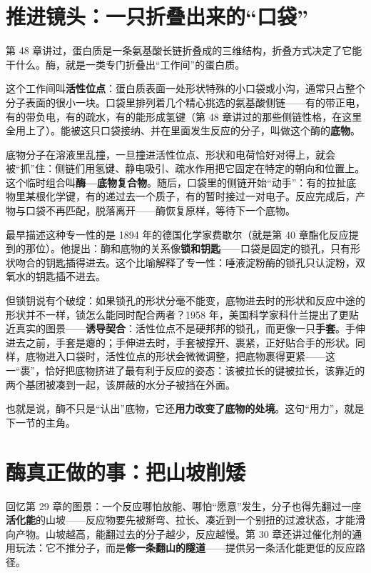 \section{推进镜头：一只折叠出来的“口袋”}

第 48 章讲过，蛋白质是一条氨基酸长链折叠成的三维结构，折叠方式决定了它能干什么。酶，就是一类专门折叠出“工作间”的蛋白质。

这个工作间叫\textbf{活性位点}：蛋白质表面一处形状特殊的小口袋或小沟，通常只占整个分子表面的很小一块。口袋里排列着几个精心挑选的氨基酸侧链——有的带正电，有的带负电，有的疏水，有的能形成氢键（第 48 章讲过的那些侧链性格，在这里全用上了）。能被这只口袋接纳、并在里面发生反应的分子，叫做这个酶的\textbf{底物}。

底物分子在溶液里乱撞，一旦撞进活性位点、形状和电荷恰好对得上，就会被“抓”住：侧链们用氢键、静电吸引、疏水作用把它固定在特定的朝向和位置上。这个临时组合叫\textbf{酶—底物复合物}。随后，口袋里的侧链开始“动手”：有的拉扯底物里某根化学键，有的递过去一个质子，有的暂时接过一对电子。反应完成后，产物与口袋不再匹配，脱落离开——酶恢复原样，等待下一个底物。

最早描述这种专一性的是 1894 年的德国化学家费歇尔（就是第 40 章酯化反应提到的那位）。他提出：酶和底物的关系像\textbf{锁和钥匙}——口袋是固定的锁孔，只有形状吻合的钥匙插得进去。这个比喻解释了专一性：唾液淀粉酶的锁孔只认淀粉，双氧水的钥匙插不进去。

但锁钥说有个破绽：如果锁孔的形状分毫不能变，底物进去时的形状和反应中途的形状并不一样，锁怎么能同时配合两者？1958 年，美国科学家科什兰提出了更贴近真实的图景——\textbf{诱导契合}：活性位点不是硬邦邦的锁孔，而更像一只\textbf{手套}。手伸进去之前，手套是瘪的；手伸进去时，手套被撑开、裹紧，正好贴合手的形状。同样，底物进入口袋时，活性位点的形状会微微调整，把底物裹得更紧——这一“裹”，恰好把底物挤进了最有利于反应的姿态：该被拉长的键被拉长，该靠近的两个基团被凑到一起，该屏蔽的水分子被挡在外面。

也就是说，酶不只是“认出”底物，它还\textbf{用力改变了底物的处境}。这句“用力”，就是下一节的主角。

\section{酶真正做的事：把山坡削矮}

回忆第 29 章的图景：一个反应哪怕放能、哪怕“愿意”发生，分子也得先翻过一座\textbf{活化能}的山坡——反应物要先被掰弯、拉长、凑近到一个别扭的过渡状态，才能滑向产物。山坡越高，能翻过去的分子越少，反应越慢。第 30 章还讲过催化剂的通用玩法：它不推分子，而是\textbf{修一条翻山的隧道}——提供另一条活化能更低的反应路径。

